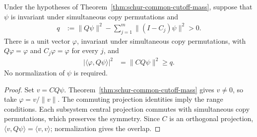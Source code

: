 \begin{theorem}
\label{thm:schur-common-cutoff-vector}
    \leanok
{}
Under the hypotheses of Theorem~\ref{thm:schur-common-cutoff-mass},
suppose that $\psi$ is invariant under simultaneous copy permutations and
\begin{align}
 q&:=\|Q\psi\|^2-\sum_{j=1}^m\|(I-C_j)\psi\|^2>0.
\end{align}
There is a unit vector $\varphi$, invariant under simultaneous copy
permutations, with $Q\varphi=\varphi$ and $C_j\varphi=\varphi$ for every
$j$, and
\begin{align}
 |\langle\varphi,Q\psi\rangle|^2&=\|CQ\psi\|^2\ge q.
\end{align}
No normalization of $\psi$ is required.
\end{theorem}
\begin{proof}
    \leanok
Set $v=CQ\psi$. Theorem~\ref{thm:schur-common-cutoff-mass} gives
$v\ne0$, so take $\varphi=v/\|v\|$. The commuting projection
identities imply the range conditions. Each subsystem central projection
commutes with simultaneous copy permutations, which preserves the symmetry.
Since $C$ is an orthogonal projection,
$\langle v,Q\psi\rangle=\langle v,v\rangle$; normalization gives the overlap.
\end{proof}

